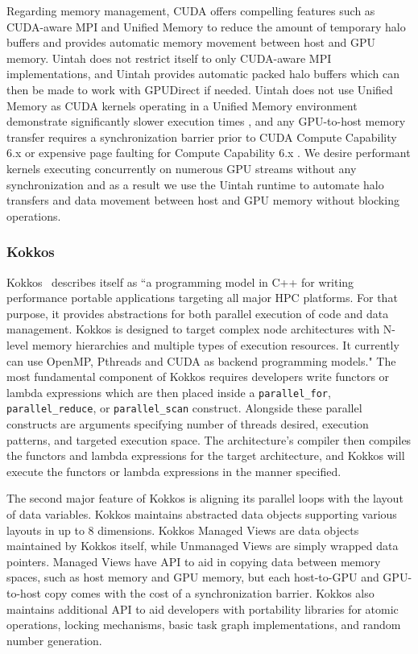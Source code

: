 \documentclass[12pt]{article}
\begin{document}
Regarding memory management, CUDA offers compelling features such as CUDA-aware MPI and Unified Memory to reduce the amount of temporary halo buffers and provides automatic memory movement between host and GPU memory.  Uintah does not restrict itself to only CUDA-aware MPI implementations, and Uintah provides automatic packed halo buffers which can then be made to work with GPUDirect if needed.  Uintah does not use Unified Memory as CUDA kernels operating in a Unified Memory environment demonstrate significantly slower execution times \cite{Landaverde2014AnIO}, and any GPU-to-host memory transfer requires a synchronization barrier prior to CUDA Compute Capability 6.x or expensive page faulting for Compute Capability 6.x \cite{nvidia-programming-guide-80}.  We desire performant kernels executing concurrently on numerous GPU streams without any synchronization and as a result we use the Uintah runtime to automate halo transfers and data movement between host and GPU memory without blocking operations.



\subsubsection{Kokkos}
\label{ch:Kokkos}
Kokkos~\cite{kokkos2012} describes itself as ``a programming model in C++ for writing performance portable applications targeting all major HPC platforms. For that purpose, it provides abstractions for both parallel execution of code and data management. Kokkos is designed to target complex node architectures with N-level memory hierarchies and multiple types of execution resources. It currently can use OpenMP, Pthreads and CUDA as backend programming models."  The most fundamental component of Kokkos requires developers write functors or lambda expressions which are then placed inside a \texttt{parallel\_for}, \texttt{parallel\_reduce}, or \texttt{parallel\_scan} construct.  Alongside these parallel constructs are arguments specifying number of threads desired, execution patterns, and targeted execution space.  The architecture's compiler then compiles the functors and lambda expressions for the target architecture, and Kokkos will execute the functors or lambda expressions in the manner specified.  

The second major feature of Kokkos is aligning its parallel loops with the layout of data variables.  Kokkos maintains abstracted data objects supporting various layouts in up to 8 dimensions.   Kokkos Managed Views are data objects maintained by Kokkos itself, while Unmanaged Views are simply wrapped data pointers.  Managed Views have API to aid in copying data between memory spaces, such as host memory and GPU memory, but each host-to-GPU and GPU-to-host copy comes with the cost of a synchronization barrier.  Kokkos also maintains additional API to aid developers with portability libraries for atomic operations, locking mechanisms, basic task graph implementations, and random number generation.
\end{document}
